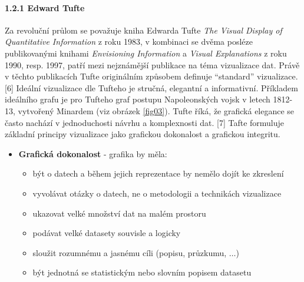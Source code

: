 \documentclass[12pt,]{article}
\providecommand{\tightlist}{%
  \setlength{\itemsep}{0pt}\setlength{\parskip}{0pt}}
\let\oldparagraph\paragraph
\renewcommand{\paragraph}[1]{\oldparagraph{#1}\mbox{}}
\begin{document}
\hypertarget{tufte}{\paragraph{1.2.1 Edward Tufte}\label{tufte}}

\qquad Za revoluční průlom se považuje kniha Edwarda Tufte \emph{The
Visual Display of Quantitative Information} z roku 1983, v kombinaci se
dvěma posléze publikovanými knihami \emph{Envisioning Information} a
\emph{Visual Explanations} z roku 1990, resp. 1997, patří mezi
nejznámější publikace na téma vizualizace dat. Právě v těchto
publikacích Tufte originálním způsobem definuje \enquote{standard}
vizualizace. {[}6{]} Ideální vizualizace dle Tufteho je stručná,
elegantní a informativní. Příkladem ideálního grafu je pro Tufteho graf
postupu Napoleonských vojsk v letech 1812-13, vytvořený Minardem (viz
obrázek \ref{fig03}). Tufte říká, že grafická elegance se často nachází
v jednoduchosti návrhu a komplexnosti dat. {[}7{]} Tafte formuluje
základní principy vizualizace jako grafickou dokonalost a grafickou
integritu.

\begin{itemize}
\tightlist
\item
  \textbf{Grafická dokonalost} - grafika by měla:

  \begin{itemize}
  \tightlist
  \item
    být o datech a během jejich reprezentace by nemělo dojít ke
    zkreslení
  \item
    vyvolávat otázky o datech, ne o metodologii a technikách vizualizace
  \item
    ukazovat velké množství dat na malém prostoru
  \item
    podávat velké datasety souvisle a logicky
  \item
    sloužit rozumnému a jasnému cíli (popisu, průzkumu, \(\dots\))
  \item
    být jednotná se statistickým nebo slovním popisem datasetu
  \end{itemize}
\end{itemize}

\newpage
\end{document}
